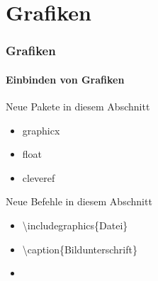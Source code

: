 \section{Grafiken}
\begin{frame}
\frametitle{Grafiken}
\framesubtitle{Einbinden von Grafiken} 
\begin{exampleblock}{Neue Pakete in diesem Abschnitt}
\begin{itemize}
\item graphicx 
\item float
\item cleveref
\end{itemize}
\end{exampleblock}

\begin{block}{Neue Befehle in diesem Abschnitt}
\begin{itemize}
\item \color{nounibaredI}\textbackslash includegraphics\color{black}\{Datei\}
\item \color{nounibaredI}\textbackslash caption\color{black}\{Bildunterschrift\}
\item {}
\end{itemize}
\end{block}

\end{frame}


